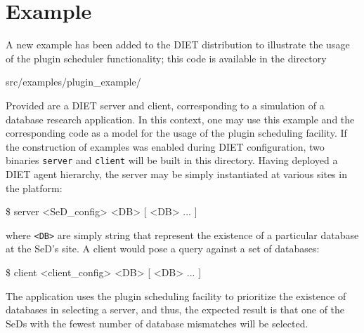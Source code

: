 



\section{Example}

A new example has been added to the DIET distribution to illustrate
the usage of the plugin scheduler functionality; this code is
available in the directory
\begin{code}
src/examples/plugin\_example/
\end{code}
Provided are a DIET server and client, corresponding to a simulation
of a database research application.  In this context, one may use this
example and the corresponding code as a model for the usage of the
plugin scheduling facility.  If the construction of examples was
enabled during DIET configuration, two binaries \texttt{server} and
\texttt{client} will be built in this directory.  Having deployed a
DIET agent hierarchy, the server may be simply instantiated at various
sites in the platform:
\begin{code}
  \$ server <SeD\_config> <DB> [ <DB> ... ]
\end{code}
where \texttt{<DB>} are simply string that represent the existence of
a particular database at the SeD's site.  A client would pose a query
against a set of databases:
\begin{code}
  \$ client <client\_config> <DB> [ <DB> ... ]
\end{code}
The application uses the plugin scheduling facility to prioritize the
existence of databases in selecting a server, and thus, the expected
result is that one of the SeDs with the fewest number of database
mismatches will be selected.


